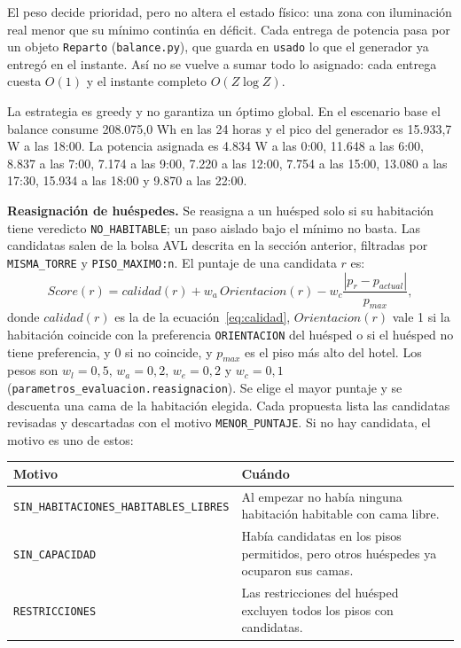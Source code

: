 \documentclass[12pt,a4paper]{article}
\newcommand{\clase}[1]{\texttt{#1}}
\newcommand{\estado}[1]{\texttt{#1}}
\newcommand{\codigo}[1]{\texttt{#1}}
\begin{document}
El peso decide prioridad, pero no altera el estado físico: una zona con iluminación real menor que su mínimo continúa en déficit. Cada entrega de potencia pasa por un objeto \clase{Reparto} (\codigo{balance.py}), que guarda en \codigo{usado} lo que el generador ya entregó en el instante. Así no se vuelve a sumar todo lo asignado: cada entrega cuesta $O(1)$ y el instante completo $O(Z\log Z)$.

La estrategia es greedy y no garantiza un óptimo global. En el escenario base el balance consume 208.075,0 Wh en las 24 horas y el pico del generador es 15.933,7 W a las 18:00. La potencia asignada es 4.834 W a las 0:00, 11.648 a las 6:00, 8.837 a las 7:00, 7.174 a las 9:00, 7.220 a las 12:00, 7.754 a las 15:00, 13.080 a las 17:30, 15.934 a las 18:00 y 9.870 a las 22:00.

\textbf{Reasignación de huéspedes.} Se reasigna a un huésped solo si su habitación tiene veredicto \estado{NO\_HABITABLE}; un paso aislado bajo el mínimo no basta. Las candidatas salen de la bolsa AVL descrita en la sección anterior, filtradas por \codigo{MISMA\_TORRE} y \codigo{PISO\_MAXIMO:n}. El puntaje de una candidata $r$ es:
\begin{equation}
 Score(r)=calidad(r)+w_a\,Orientacion(r)-w_c\frac{|p_r-p_{actual}|}{p_{max}},
 \label{eq:score}
\end{equation}
donde $calidad(r)$ es la de la ecuación~\ref{eq:calidad}, $Orientacion(r)$ vale 1 si la habitación coincide con la preferencia \codigo{ORIENTACION} del huésped o si el huésped no tiene preferencia, y 0 si no coincide, y $p_{max}$ es el piso más alto del hotel. Los pesos son $w_l=0,5$, $w_a=0,2$, $w_e=0,2$ y $w_c=0,1$ (\codigo{parametros\_evaluacion.reasignacion}). Se elige el mayor puntaje y se descuenta una cama de la habitación elegida. Cada propuesta lista las candidatas revisadas y descartadas con el motivo \codigo{MENOR\_PUNTAJE}. Si no hay candidata, el motivo es uno de estos:

\begin{center}\small
\begin{tabular}{p{}p{}}
\toprule
\textbf{Motivo} & \textbf{Cuándo}\\
\midrule
\codigo{SIN\_HABITACIONES\_HABITABLES\_LIBRES} & Al empezar no había ninguna habitación habitable con cama libre.\\
\codigo{SIN\_CAPACIDAD} & Había candidatas en los pisos permitidos, pero otros huéspedes ya ocuparon sus camas.\\
\codigo{RESTRICCIONES} & Las restricciones del huésped excluyen todos los pisos con candidatas.\\
\bottomrule
\end{tabular}
\end{center}
\end{document}
